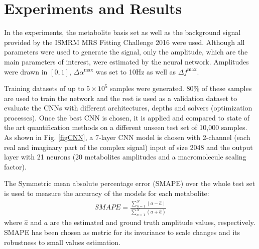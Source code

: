 \documentclass{llncs}
\begin{document}
\section{Experiments and Results}

In the experiments, the metabolite basis set as well as the background signal provided by the ISMRM MRS Fitting Challenge 2016 %
were used. Although all parameters were used to generate the signal, only the amplitude, which are the main parameters of interest,
were estimated by the neural network.
Amplitudes were drawn in $[0,1]$, $\Delta \alpha^\text{max}$ was set to 10Hz as well as $\Delta f^\text{max}$.

Training datasets of up to $5\times10^5$ samples were generated. 80\% of these samples are used to train the network and the rest is used 
as a validation dataset to evaluate the CNNs with different architectures, depths and solvers (optimization processes).
Once the best CNN is chosen, it is applied and compared to state of the art quantification methods on a different unseen test set
of 10,000 samples. 
As shown in Fig. \ref{figCNN}, a 7-layer CNN model is chosen with 2-channel (each real and imaginary part of the complex signal) input of size 2048 and the output layer with 21 neurons (20 metabolites amplitudes and a macromolecule scaling factor). 

The Symmetric mean absolute percentage error (SMAPE) \cite{SMAPE} over the whole test set is used to measure the accuracy of the models for each metabolite:
\begin{eqnarray}
SMAPE = \frac{\sum_{n=1}^{N} \mid a - \hat{a}\mid } {\sum_{n=1}^{N} (a + \hat{a})}
\end{eqnarray}
where $\hat{a}$ and $a$ are the estimated and ground truth amplitude values, respectively. 
SMAPE has been chosen as metric for its invariance to scale changes and its robustness to small values estimation.
\end{document}
